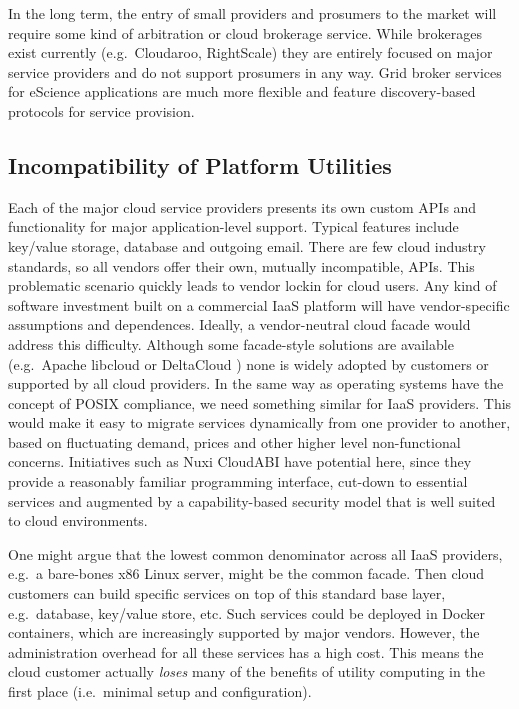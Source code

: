 \documentclass[conference,10pt]{IEEEtran}
\begin{document}
In the long term, the entry of small providers and prosumers to the market will require some kind of arbitration or cloud brokerage service. While brokerages exist currently (e.g.\ Cloudaroo, RightScale) they are entirely focused on major service providers and do not support prosumers in any way.
Grid broker services \cite{url4} for eScience applications are much more flexible and feature discovery-based protocols for service provision. 


\subsection{Incompatibility of Platform Utilities}

Each of the major cloud service providers presents its own custom APIs and functionality for major application-level support. Typical features include key/value storage, database and outgoing email.
There are few cloud industry standards, so all vendors offer their own, mutually incompatible, APIs.
This problematic scenario quickly leads to vendor lockin for cloud users. Any kind of software investment built on a commercial IaaS platform will have vendor-specific assumptions and dependences. 
Ideally, a vendor-neutral cloud facade \cite{martino15cross} would address this difficulty. Although some facade-style solutions are available (e.g.\ Apache libcloud \cite{url5} or DeltaCloud \cite{url6}) none is widely adopted by customers or supported by all cloud providers.
In the same way as operating systems have the concept of POSIX compliance, we need something similar for IaaS providers. This would make it easy to migrate services dynamically from one provider to another, based on fluctuating demand, prices and other higher level non-functional concerns. Initiatives such as Nuxi CloudABI \cite{nuxi} have potential here, since they provide a reasonably familiar programming interface, cut-down to essential services and augmented by a capability-based security model that is well suited to cloud environments. 

One might argue that the lowest common denominator across all IaaS providers, e.g.\ a bare-bones x86 Linux server, might be the common facade. Then cloud customers can build specific services on top of this standard base layer, e.g.\ database, key/value store, etc. Such services could be deployed in Docker containers, which are increasingly supported by major vendors. However, the administration overhead for all these services has a high cost.
This means the cloud customer actually \emph{loses} many of the benefits of utility computing in the first place
(i.e.\ minimal setup and configuration).
\end{document}
